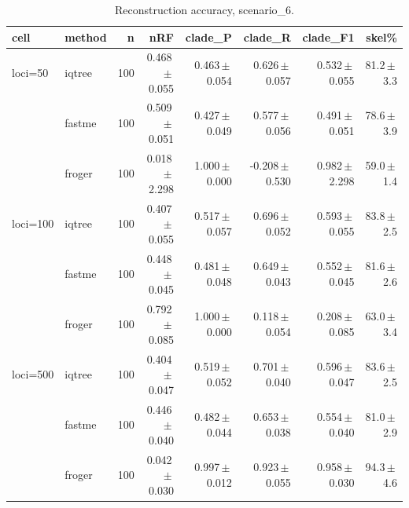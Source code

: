 \begin{table}[t]
\centering
\caption{Reconstruction accuracy, scenario\_6.}
\label{tab:scenario6}
\begin{tabular}{ll r rrrrr}
\toprule
cell & method & n & nRF & clade\_P & clade\_R & clade\_F1 & skel\% \\
\midrule
loci=50 & iqtree & 100 & 0.468\,$\pm$\,0.055 & 0.463\,$\pm$\,0.054 & 0.626\,$\pm$\,0.057 & 0.532\,$\pm$\,0.055 & 81.2\,$\pm$\,3.3 \\
 & fastme & 100 & 0.509\,$\pm$\,0.051 & 0.427\,$\pm$\,0.049 & 0.577\,$\pm$\,0.056 & 0.491\,$\pm$\,0.051 & 78.6\,$\pm$\,3.9 \\
 & froger & 100 & 0.018\,$\pm$\,2.298 & 1.000\,$\pm$\,0.000 & -0.208\,$\pm$\,0.530 & 0.982\,$\pm$\,2.298 & 59.0\,$\pm$\,1.4 \\
loci=100 & iqtree & 100 & 0.407\,$\pm$\,0.055 & 0.517\,$\pm$\,0.057 & 0.696\,$\pm$\,0.052 & 0.593\,$\pm$\,0.055 & 83.8\,$\pm$\,2.5 \\
 & fastme & 100 & 0.448\,$\pm$\,0.045 & 0.481\,$\pm$\,0.048 & 0.649\,$\pm$\,0.043 & 0.552\,$\pm$\,0.045 & 81.6\,$\pm$\,2.6 \\
 & froger & 100 & 0.792\,$\pm$\,0.085 & 1.000\,$\pm$\,0.000 & 0.118\,$\pm$\,0.054 & 0.208\,$\pm$\,0.085 & 63.0\,$\pm$\,3.4 \\
loci=500 & iqtree & 100 & 0.404\,$\pm$\,0.047 & 0.519\,$\pm$\,0.052 & 0.701\,$\pm$\,0.040 & 0.596\,$\pm$\,0.047 & 83.6\,$\pm$\,2.5 \\
 & fastme & 100 & 0.446\,$\pm$\,0.040 & 0.482\,$\pm$\,0.044 & 0.653\,$\pm$\,0.038 & 0.554\,$\pm$\,0.040 & 81.0\,$\pm$\,2.9 \\
 & froger & 100 & 0.042\,$\pm$\,0.030 & 0.997\,$\pm$\,0.012 & 0.923\,$\pm$\,0.055 & 0.958\,$\pm$\,0.030 & 94.3\,$\pm$\,4.6 \\
\bottomrule
\end{tabular}
\end{table}